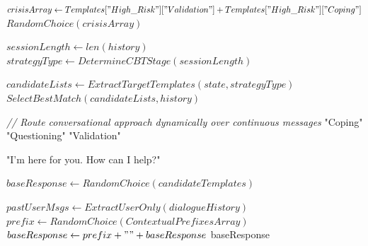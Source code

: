 \documentclass[11pt]{report}
\begin{document}
\begin{algorithm}[H]
\caption{Route Critical High-Risk State Interventions}
\label{alg:cbt_high_risk}
\begin{algorithmic}[1]
        \State $crisisArray \gets Templates["High\_Risk"]["Validation"] + Templates["High\_Risk"]["Coping"]$
        \State \Return $RandomChoice(crisisArray)$
    \EndIf
    
    \State $sessionLength \gets len(history)$
    \State $strategyType \gets DetermineCBTStage(sessionLength)$
    
    \State $candidateLists \gets ExtractTargetTemplates(state, strategyType)$
    \State \Return $SelectBestMatch(candidateLists, history)$
\EndProcedure
\end{algorithmic}
\end{algorithm}

\begin{algorithm}[H]
\caption{Determine Optimal Evaluative Stage Frameworks}
\label{alg:cbt_stage}
\begin{algorithmic}[1]
    \State \textit{// Route conversational approach dynamically over continuous messages}
        \State \Return "Coping"
        \State \Return "Questioning"
    \Else
        \State \Return "Validation"
    \EndIf
\EndProcedure
\end{algorithmic}
\end{algorithm}

\begin{algorithm}[H]
\caption{Select Random Optimal Conversational Constructs}
\label{alg:cbt_select}
\begin{algorithmic}[1]
        \State \Return "I'm here for you. How can I help?"
    \EndIf
    
    \State $baseResponse \gets RandomChoice(candidateTemplates)$
    
        \State $pastUserMsgs \gets ExtractUserOnly(dialogueHistory)$
            \State $prefix \gets RandomChoice(ContextualPrefixesArray)$
            \State $baseResponse \gets prefix + " " + baseResponse$
        \EndIf
    \EndIf
    \State \Return baseResponse
\EndProcedure
\end{algorithmic}
\end{algorithm}
\end{document}
